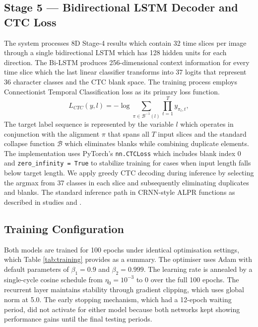 \documentclass[preprint,12pt]{elsarticle}
\begin{document}
\subsection{Stage 5 — Bidirectional LSTM Decoder and CTC Loss}
The system processes 8D Stage-4 results which contain 32 time slices per image through a single bidirectional LSTM which has 128 hidden units for each direction. The Bi-LSTM produces 256-dimensional context information for every time slice which the last linear classifier transforms into 37 logits that represent 36 character classes and the CTC blank space. The training process employs Connectionist Temporal Classification loss \cite{b3} as its primary loss function.
\begin{equation}
L_{CTC}(y, l) = - \log \sum_{\pi \in \mathcal{B}^{-1}(l)} \prod_{t=1}^{T} y_{\pi_t, t},
\end{equation}
The target label sequence is represented by the variable $l$ which operates in conjunction with the alignment $\pi$ that spans all $T$ input slices and the standard collapse function $\mathcal{B}$ which eliminates blanks while combining duplicate elements. The implementation uses PyTorch's \texttt{nn.CTCLoss} which includes blank index 0 and \texttt{zero\_infinity = True} to stabilize training for cases when input length falls below target length. We apply greedy CTC decoding during inference by selecting the argmax from 37 classes in each slice and subsequently eliminating duplicates and blanks. The standard inference path in CRNN-style ALPR functions as described in studies \cite{b12} and \cite{b14}.

\subsection{Training Configuration}
Both models are trained for 100 epochs under identical optimisation settings, which Table \ref{tab:training} provides as a summary. The optimiser uses Adam \cite{b8} with default parameters of $\beta_1 = 0.9$ and $\beta_2 = 0.999$. The learning rate is annealed by a single-cycle cosine schedule \cite{b33} from $\eta_0 = 10^{-3}$ to 0 over the full 100 epochs. The recurrent layer maintains stability through gradient clipping, which uses global norm at 5.0. The early stopping mechanism, which had a 12-epoch waiting period, did not activate for either model because both networks kept showing performance gains until the final testing periods.
\end{document}
